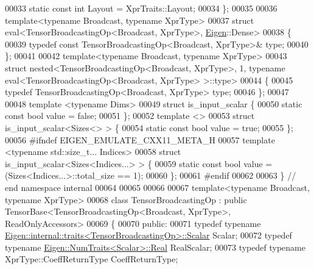 \begin{DoxyCode}
00033   \textcolor{keyword}{static} \textcolor{keyword}{const} \textcolor{keywordtype}{int} Layout = XprTraits::Layout;
00034 \};
00035 
00036 \textcolor{keyword}{template}<\textcolor{keyword}{typename} Broadcast, \textcolor{keyword}{typename} XprType>
00037 \textcolor{keyword}{struct }eval<TensorBroadcastingOp<Broadcast, XprType>, \hyperlink{namespace_eigen}{Eigen}::Dense>
00038 \{
00039   \textcolor{keyword}{typedef} \textcolor{keyword}{const} TensorBroadcastingOp<Broadcast, XprType>& type;
00040 \};
00041 
00042 \textcolor{keyword}{template}<\textcolor{keyword}{typename} Broadcast, \textcolor{keyword}{typename} XprType>
00043 \textcolor{keyword}{struct }nested<TensorBroadcastingOp<Broadcast, XprType>, 1, typename eval<TensorBroadcastingOp<Broadcast, 
      XprType> >::type>
00044 \{
00045   \textcolor{keyword}{typedef} TensorBroadcastingOp<Broadcast, XprType> type;
00046 \};
00047 
00048 \textcolor{keyword}{template} <\textcolor{keyword}{typename} Dims>
00049 \textcolor{keyword}{struct }is\_input\_scalar \{
00050   \textcolor{keyword}{static} \textcolor{keyword}{const} \textcolor{keywordtype}{bool} value = \textcolor{keyword}{false};
00051 \};
00052 \textcolor{keyword}{template} <>
00053 \textcolor{keyword}{struct }is\_input\_scalar<Sizes<> > \{
00054   \textcolor{keyword}{static} \textcolor{keyword}{const} \textcolor{keywordtype}{bool} value = \textcolor{keyword}{true};
00055 \};
00056 \textcolor{preprocessor}{#ifndef EIGEN\_EMULATE\_CXX11\_META\_H}
00057 \textcolor{keyword}{template} <\textcolor{keyword}{typename} std::size\_t... Indices>
00058 \textcolor{keyword}{struct }is\_input\_scalar<Sizes<Indices...> > \{
00059   \textcolor{keyword}{static} \textcolor{keyword}{const} \textcolor{keywordtype}{bool} value = (Sizes<Indices...>::total\_size == 1);
00060 \};
00061 \textcolor{preprocessor}{#endif}
00062 
00063 \}  \textcolor{comment}{// end namespace internal}
00064 
00065 
00066 
00067 \textcolor{keyword}{template}<\textcolor{keyword}{typename} Broadcast, \textcolor{keyword}{typename} XprType>
00068 \textcolor{keyword}{class }TensorBroadcastingOp : \textcolor{keyword}{public} TensorBase<TensorBroadcastingOp<Broadcast, XprType>, ReadOnlyAccessors>
00069 \{
00070   \textcolor{keyword}{public}:
00071   \textcolor{keyword}{typedef} \textcolor{keyword}{typename} \hyperlink{struct_eigen_1_1internal_1_1traits}{Eigen::internal::traits<TensorBroadcastingOp>::Scalar}
       Scalar;
00072   \textcolor{keyword}{typedef} \textcolor{keyword}{typename} \hyperlink{group___sparse_core___module}{Eigen::NumTraits<Scalar>::Real} RealScalar;
00073   \textcolor{keyword}{typedef} \textcolor{keyword}{typename} XprType::CoeffReturnType CoeffReturnType;

\end{DoxyCode}
